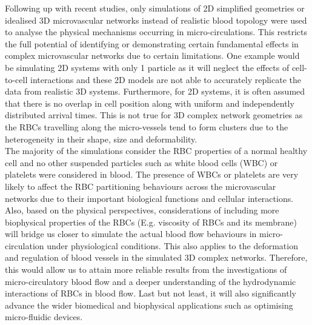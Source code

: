 \noindent Following up with recent studies, only simulations of 2D simplified geometries or idealised 3D microvascular networks instead of realistic blood topology were used to analyse the physical mechanisms occurring in micro-circulations.\cite{Noguchi14159, DoddiSaiK2009Tcmo, Balogh2017DirectNetworks, 2020Charles, YAN199117, Possenti2019, EndenG1994ANSo, MehrabadiMarmar2015ACMf, VahidkhahKoohyar2014PDiT, HariprasadSecomb2014, Zhou2021EmergentBifurcations} This restricts the full potential of identifying or demonstrating certain fundamental effects in complex microvascular networks due to certain limitations. One example would be simulating 2D systems with only 1 particle as it will neglect the effects of cell-to-cell interactions and these 2D models are not able to accurately replicate the data from realistic 3D systems.\cite{PhysRevE.86.056308} Furthermore, for 2D systems, it is often assumed that there is no overlap in cell position along with uniform and independently distributed arrival times.\cite{Balogh2017DirectNetworks} This is not true for 3D complex network geometries as the RBCs travelling along the micro-vessels tend to form clusters due to the heterogeneity in their shape, size and deformability.\cite{gaehtgens1980motion} \\

\noindent The majority of the simulations consider the RBC properties of a normal healthy cell and no other suspended particles such as white blood cells (WBC) or platelets were considered in blood.\cite{Balogh2017DirectNetworks, 2020Charles, Balogh2018} The presence of WBCs or platelets are very likely to affect the RBC partitioning behaviours across the microvascular networks due to their important biological functions and cellular interactions. Also, based on the physical perspectives, considerations of including more biophysical properties of the RBCs (E.g. viscosity of RBCs and its membrane) will bridge us closer to simulate the actual blood flow behaviours in micro-circulation under physiological conditions. This also applies to the deformation and regulation of blood vessels in the simulated 3D complex networks. Therefore, this would allow us to attain more reliable results from the investigations of micro-circulatory blood flow and a deeper understanding of the hydrodynamic interactions of RBCs in blood flow. Last but not least, it will also significantly advance the wider biomedical and biophysical applications such as optimising micro-fluidic devices. 